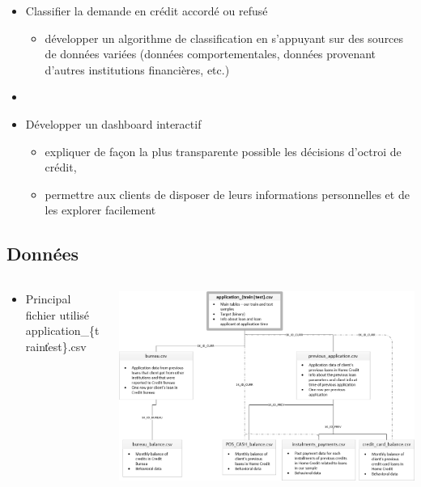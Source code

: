 \documentclass[8pt,aspectratio=169,hyperref={unicode=true}]{beamer}
\begin{document}
\begin{frame}{\insertsubsection}
\begin{itemize}
\begin{itemize}
                  \item Classifier la demande en crédit accordé ou refusé
                        \begin{itemize}
                            \item développer un algorithme de classification en s’appuyant sur des sources de données variées (données comportementales, données provenant d'autres institutions financières, etc.)
                        \end{itemize}
                  \item[]
                  \item Développer un dashboard interactif
                        \begin{itemize}
                            \item expliquer de façon la plus transparente possible les décisions d’octroi de crédit,
                            \item permettre aux clients de disposer de leurs informations personnelles et de les explorer facilement
                        \end{itemize}
              \end{itemize}
    \end{itemize}
\end{frame}

\subsection{Données}
\begin{frame}{\insertsubsection}
    \begin{columns}
        \begin{column}{.4\textwidth}
            \begin{itemize}
                \item Principal fichier utilisé application\_\{train\|test\}.csv
            \end{itemize}
        \end{column}
        \begin{column}{.6\textwidth}
            \includegraphics[width=\textwidth]{./home_credit.png}
        \end{column}
    \end{columns}
\end{frame}
\end{document}
